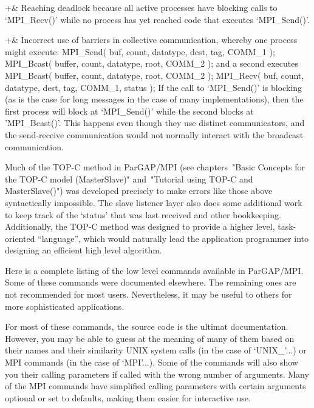 +& Reaching deadlock because all active processes have blocking
calls to `MPI_Recv()' while no process has yet reached code that
executes `MPI_Send()'.

+& Incorrect use of barriers in collective communication, whereby one
process might execute:
\begintt
MPI_Send( buf, count, datatype, dest, tag, COMM_1 );
MPI_Bcast( buffer, count, datatype, root, COMM_2 );
\endtt
and a second executes
\begintt
MPI_Bcast( buffer, count, datatype, root, COMM_2 );
MPI_Recv( buf, count, datatype, dest, tag, COMM_1, status );
\endtt
If the call to `MPI_Send()' is blocking (as is the case for long
messages in the case of many implementations), then the first process
will block at `MPI_Send()' while the second blocks at 'MPI_Bcast()'.
This happens even though they use distinct communicators, and the
send-receive communication would not normally interact with the
broadcast communication.
\enditems

Much of the TOP-C method in ParGAP/MPI (see chapters~"Basic Concepts
for the TOP-C model (MasterSlave)" and~"Tutorial using TOP-C and
MasterSlave()") was developed precisely to make errors like those
above syntactically impossible.  The slave listener layer also does some
additional work to keep track of the `status' that was last received
and other bookkeeping.  Additionally, the TOP-C method was
designed to provide a higher level, task-oriented ``language'', which
would naturally lead the application programmer into designing an
efficient high level algorithm.



Here is a complete listing of the low level commands available in
ParGAP/MPI.  Some of these commands were documented elsewhere.  The
remaining ones are not recommended for most users.  Nevertheless, it
may be useful to others for more sophisticated applications.

For most of these commands, the source code is the ultimat documentation.
However, you may be able to guess at the meaning of many of them based on
their names and their similarity UNIX system calls (in the case of
`UNIX_'...) or MPI commands (in the case of `MPI'...).  Some of the
commands will also show you their calling parameters if called with
the wrong number of arguments.  Many of the
MPI commands have simplified calling parameters with certain
arguments optional or set to defaults, making them easier for interactive use.

